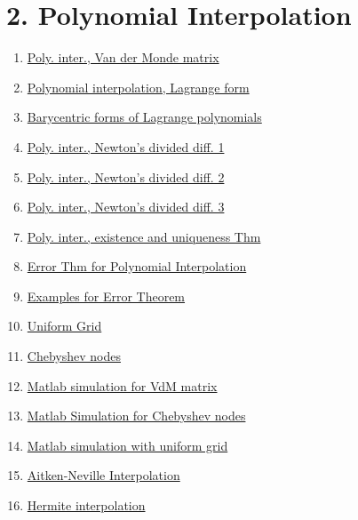 \documentclass[11pt]{article}
\begin{document}
\vspace{-1cm}

\section*{2. Polynomial Interpolation}

\vspace{-0.5cm}

\begin{multicols}{2}
	\begin{enumerate}
		\item \href{https://mp.weixin.qq.com/s/9yUIeWYNzgn2FgCt8AGujQ}{Poly. inter., Van der Monde matrix}	%
		\item \href{https://mp.weixin.qq.com/s/9ML5eqtNbdMjpY5uYRQaSg}{Polynomial interpolation, Lagrange form}	%
		\item \href{https://mp.weixin.qq.com/s/se_xxFTL8u--rEhU2ydl1A}{Barycentric forms of Lagrange polynomials}	%
		\item \href{https://mp.weixin.qq.com/s/Bq_CHw7hC2YKOJlEoKOXbg}{Poly. inter., Newton's divided diff. 1}	%
		\item \href{https://mp.weixin.qq.com/s/8f7N-_PPe0TTwwQC8kvFLw}{Poly. inter., Newton's divided diff. 2}	%
		\item \href{https://mp.weixin.qq.com/s/6bWSlqWqDOJ9Ju06fdTOtg}{Poly. inter., Newton's divided diff. 3}	%
		\item \href{https://mp.weixin.qq.com/s/cCADIfro1dgt1ilxQgAnEQ}{Poly. inter., existence and uniqueness Thm}	%
		\item \href{https://mp.weixin.qq.com/s/k00gBj9Sod_2YdxdX-pZqA}{Error Thm for Polynomial Interpolation}	%
		\item \href{https://mp.weixin.qq.com/s/HmGJt5Fb1LGDkwZW1MQibg}{Examples for Error Theorem}	%
		\item \href{https://mp.weixin.qq.com/s/rNiDjcs1ZCZVLgzX8i4tPA}{Uniform Grid}	%
		\item \href{https://mp.weixin.qq.com/s/XoZ4JQd7TGLjr81kCegHgQ}{Chebyshev nodes}	%
		\item \href{https://mp.weixin.qq.com/s/tj3uPgaqMjDSXXfUAte4rQ}{Matlab simulation for VdM matrix}	%
		\item \href{https://mp.weixin.qq.com/s/0CyWNhXiXUwuF3jzr193Lg}{Matlab Simulation for Chebyshev nodes}	%
		\item \href{https://mp.weixin.qq.com/s/GfiEj_0CgIvv-uiLXS3frQ}{Matlab simulation with uniform grid}	%
		\item \href{https://mp.weixin.qq.com/s/d9y1vepHoLCxwcbZnSAtxg}{Aitken-Neville Interpolation}	%
		\item \href{https://mp.weixin.qq.com/s/RFVVuY_8-E4KUYCL5LjXdg}{Hermite interpolation}	%
	\end{enumerate}
\end{multicols}
\end{document}
